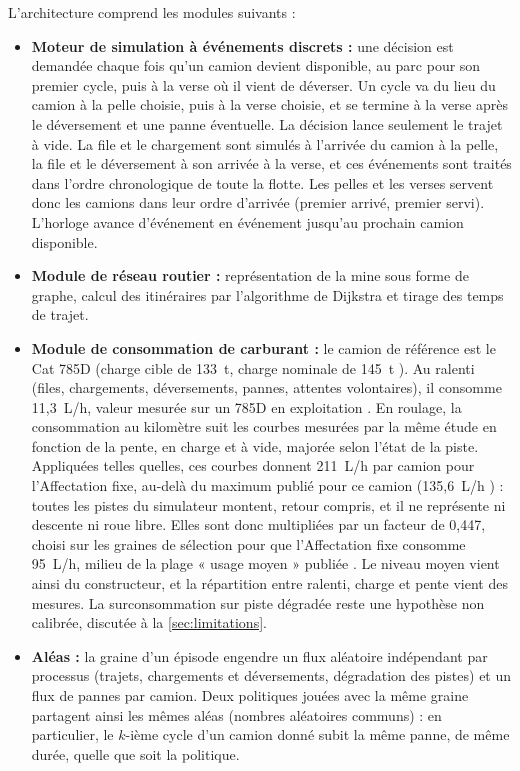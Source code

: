 \documentclass[11pt,a4paper]{article}
\newif\ifrevmarks
\newcommand{\revtag}[1]{\ifrevmarks\textsuperscript{\textcolor{red!70!black}{\scriptsize[#1]}}\fi}
\newcommand{\rev}[2]{\ifrevmarks{\color{revcolor}#2}\revtag{#1}\else#2\fi}
\newenvironment{revbloc}[1]{\par\ifrevmarks\color{revcolor}\noindent\revtag{#1}\ \fi}{\par}
\begin{document}
\begin{revbloc}{M11, A, v3}
L'architecture comprend les modules suivants :

\begin{itemize}
  \item \textbf{Moteur de simulation à événements discrets :} une décision est demandée chaque fois qu'un camion devient disponible, au parc pour son premier cycle, puis à la verse où il vient de déverser. Un cycle va du lieu du camion à la pelle choisie, puis à la verse choisie, et se termine à la verse après le déversement et une panne éventuelle. La décision lance seulement le trajet à vide. La file et le chargement sont simulés à l'arrivée du camion à la pelle, la file et le déversement à son arrivée à la verse, et ces événements sont traités dans l'ordre chronologique de toute la flotte. Les pelles et les verses servent donc les camions dans leur ordre d'arrivée (premier arrivé, premier servi). L'horloge avance d'événement en événement jusqu'au prochain camion disponible.
  \item \textbf{Module de réseau routier :} représentation de la mine sous forme de graphe, calcul des itinéraires par l'algorithme de Dijkstra et tirage des temps de trajet.
  \item \textbf{Module de consommation de carburant :} \rev{v3, M20}{le camion de référence est le Cat 785D (charge cible de 133~t, charge nominale de 145~t \cite{Caterpillar2019,Caterpillar785D2025}). Au ralenti (files, chargements, déversements, pannes, attentes volontaires), il consomme 11,3~L/h, valeur mesurée sur un 785D en exploitation \cite{Kubler2015}. En roulage, la consommation au kilomètre suit les courbes mesurées par la même étude en fonction de la pente, en charge et à vide, majorée selon l'état de la piste. Appliquées telles quelles, ces courbes donnent 211~L/h par camion pour l'Affectation fixe, au-delà du maximum publié pour ce camion (135,6~L/h \cite{Caterpillar2019}) : toutes les pistes du simulateur montent, retour compris, et il ne représente ni descente ni roue libre. Elles sont donc multipliées par un facteur de 0,447, choisi sur les graines de sélection pour que l'Affectation fixe consomme 95~L/h, milieu de la plage « usage moyen » publiée \cite{Caterpillar2019}. Le niveau moyen vient ainsi du constructeur, et la répartition entre ralenti, charge et pente vient des mesures. La surconsommation sur piste dégradée reste une hypothèse non calibrée, discutée à la \cref{sec:limitations}.}
  \item \textbf{Aléas :} la graine d'un épisode engendre un flux aléatoire indépendant par processus (trajets, chargements et déversements, dégradation des pistes) et un flux de pannes par camion. Deux politiques jouées avec la même graine partagent ainsi les mêmes aléas (nombres aléatoires communs) : en particulier, le $k$-ième cycle d'un camion donné subit la même panne, de même durée, quelle que soit la politique.

\end{itemize}
\end{revbloc}
\end{document}
